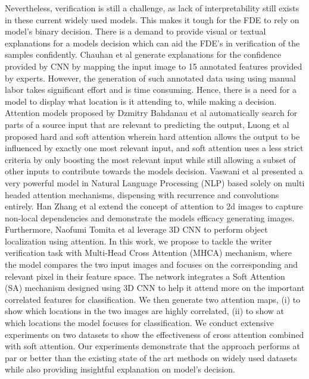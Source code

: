 \documentclass[a4paper,conference]{IEEEtran}
\begin{document}
\newline \indent Nevertheless, verification is still a challenge, as lack of interpretability still exists in these current widely used models. This makes it tough for the FDE to rely on model's binary decision. There is a demand to provide visual or textual explanations for a models decision which can aid the FDE's in verification of the samples confidently. Chauhan et al\cite{chauhan_explanation_2019} generate explanations for the confidence provided by CNN by mapping the input image to 15 annotated features provided by experts. However, the generation of such annotated data using using manual labor takes significant effort and is time consuming. 
\newline \indent Hence, there is a need for a model to display what location is it attending to, while making a decision. Attention models proposed by Dzmitry Bahdanau et al\cite{BahdanauCB14} automatically search for parts of a source input that are relevant to predicting the output, Luong et al\cite{luong_effective_2015} proposed hard and soft attention wherein hard attention allows the output to be influenced by exactly one most relevant input, and soft attention uses a less strict criteria by only boosting the most relevant input while still allowing a subset of other inputs to contribute towards the models decision. Vaswani et al\cite{vaswani_attention_2017} presented a very powerful model in Natural Language Processing (NLP) based solely on multi headed attention mechanisms, dispensing with recurrence and convolutions entirely. Han Zhang et al\cite{zhang_self-attention_2019} extend the concept of attention to 2d images to capture non-local dependencies and demonstrate the models efficacy generating images. Furthermore, Naofumi Tomita et al\cite{tomita_attention-based_2019} leverage 3D CNN to perform object localization using attention. 
\newline \indent In this work, we propose to tackle the writer verification task with Multi-Head Cross Attention (MHCA) mechanism, where the model compares the two input images and focuses on the corresponding and relevant pixel in their feature space. The network integrates a Soft Attention (SA) mechanism designed using 3D CNN to help it attend more on the important correlated features for classification. We then generate two attention maps, (i) to show which locations in the two images are highly correlated, (ii) to show at which locations the model focuses for classification. We conduct extensive experiments on two datasets to show the effectiveness of cross attention combined with soft attention. Our experiments demonstrate that the approach performs at par or better than the existing state of the art methods on widely used datasets while also providing insightful explanation on model's decision.
\end{document}
